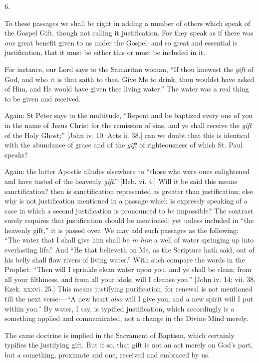 6.

To these passages we shall be right in adding a number of others
which speak of the Gospel Gift, though not calling it
justification. For they speak as if there was \emph{one} great benefit given
to us under the Gospel; and so great and essential is justification,
that it must be either this or must be included in it.

For instance, our Lord says to the Samaritan woman, ``If thou
knewest the \emph{gift} of God, and who it is that saith to thee, Give
Me to drink, thou wouldst have asked of Him, and He would have given
thee living water.'' The water was a real thing to be given and
received.

Again: St Peter says to the multitude, ``Repent and be baptized
every one of you in the name of Jesus Christ for the remission of
sins, and ye shall receive the \emph{gift} of the Holy Ghost;''
[John iv. 10. Acts ii. 38.] can we doubt that this is identical with
the abundance of grace and of the \emph{gift} of righteousness of
which St. Paul speaks?

Again: the latter Apostle alludes elsewhere to ``those who were
once enlightened and have tasted of the heavenly \emph{gift}.''
[Heb. vi. 4.] Will it be said this means sanctification? then is
sanctification represented as greater than justification; else why is
not justification mentioned in a passage which is expressly speaking
of a case in which a second justification is pronounced to be
impossible? The contrast surely requires that justification should be
mentioned; yet unless included in ``the heavenly gift,'' it is
passed over. We may add such passages as the following: ``The
water that I shall give him shall be \emph{in him} a well of water
springing up into everlasting life.'' And ``He that believeth
on Me, as the Scripture hath said, out of his belly shall flow rivers
of living water.'' With such compare the words in the Prophet:
``Then will I sprinkle clean water upon you, and ye shall be
clean; from all your filthiness, and from all your idols, will I
cleanse you.'' [John iv. 14; vii. 38. Ezek. xxxvi. 25.] This means
justifying purification, for renewal is not mentioned till the next
verse:—``A new heart \emph{also} will I give you, and a new
spirit will I put within you.'' By water, I say, is typified
justification, which accordingly is a something applied and
communicated, not a change in the Divine Mind merely.

The same doctrine is implied in the Sacrament of Baptism, which
certainly typifies the justifying gift. But if so, that gift is not an
act merely on God's part, but a something, proximate and one, received
and embraced by us.

